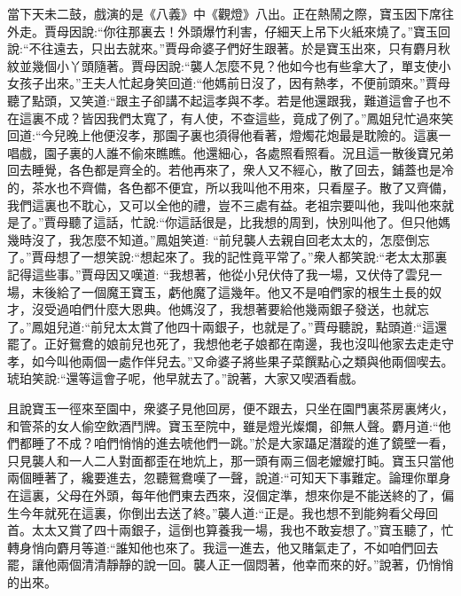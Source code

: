 \begin{parag}
    當下天未二鼓，戲演的是《八義》中《觀燈》八出。正在熱鬧之際，寶玉因下席往外走。賈母因說:“你往那裏去！外頭爆竹利害，仔細天上吊下火紙來燒了。”寶玉回說:“不往遠去，只出去就來。”賈母命婆子們好生跟著。於是寶玉出來，只有麝月秋紋並幾個小丫頭隨著。賈母因說:“襲人怎麼不見？他如今也有些拿大了，單支使小女孩子出來。”王夫人忙起身笑回道:“他媽前日沒了，因有熱孝，不便前頭來。”賈母聽了點頭，又笑道:“跟主子卻講不起這孝與不孝。若是他還跟我，難道這會子也不在這裏不成？皆因我們太寬了，有人使，不查這些，竟成了例了。”鳳姐兒忙過來笑回道:“今兒晚上他便沒孝，那園子裏也須得他看著，燈燭花炮最是耽險的。這裏一唱戲，園子裏的人誰不偷來瞧瞧。他還細心，各處照看照看。況且這一散後寶兄弟回去睡覺，各色都是齊全的。若他再來了，衆人又不經心，散了回去，鋪蓋也是冷的，茶水也不齊備，各色都不便宜，所以我叫他不用來，只看屋子。散了又齊備，我們這裏也不耽心，又可以全他的禮，豈不三處有益。老祖宗要叫他，我叫他來就是了。”賈母聽了這話，忙說:“你這話很是，比我想的周到，快別叫他了。但只他媽幾時沒了，我怎麼不知道。”鳳姐笑道: “前兒襲人去親自回老太太的，怎麼倒忘了。”賈母想了一想笑說:“想起來了。我的記性竟平常了。”衆人都笑說:“老太太那裏記得這些事。”賈母因又嘆道: “我想著，他從小兒伏侍了我一場，又伏侍了雲兒一場，末後給了一個魔王寶玉，虧他魔了這幾年。他又不是咱們家的根生土長的奴才，沒受過咱們什麼大恩典。他媽沒了，我想著要給他幾兩銀子發送，也就忘了。”鳳姐兒道:“前兒太太賞了他四十兩銀子，也就是了。”賈母聽說，點頭道:“這還罷了。正好鴛鴦的娘前兒也死了，我想他老子娘都在南邊，我也沒叫他家去走走守孝，如今叫他兩個一處作伴兒去。”又命婆子將些果子菜饌點心之類與他兩個喫去。琥珀笑說:“還等這會子呢，他早就去了。”說著，大家又喫酒看戲。
\end{parag}


\begin{parag}
    且說寶玉一徑來至園中，衆婆子見他回房，便不跟去，只坐在園門裏茶房裏烤火，和管茶的女人偷空飲酒鬥牌。寶玉至院中，雖是燈光燦爛，卻無人聲。麝月道:“他們都睡了不成？咱們悄悄的進去唬他們一跳。”於是大家躡足潛蹤的進了鏡壁一看，只見襲人和一人二人對面都歪在地炕上，那一頭有兩三個老嬤嬤打盹。寶玉只當他兩個睡著了，纔要進去，忽聽鴛鴦嘆了一聲，說道:“可知天下事難定。論理你單身在這裏，父母在外頭，每年他們東去西來，沒個定準，想來你是不能送終的了，偏生今年就死在這裏，你倒出去送了終。”襲人道:“正是。我也想不到能夠看父母回首。太太又賞了四十兩銀子，這倒也算養我一場，我也不敢妄想了。”寶玉聽了，忙轉身悄向麝月等道:“誰知他也來了。我這一進去，他又賭氣走了，不如咱們回去罷，讓他兩個清清靜靜的說一回。襲人正一個悶著，他幸而來的好。”說著，仍悄悄的出來。
\end{parag}


